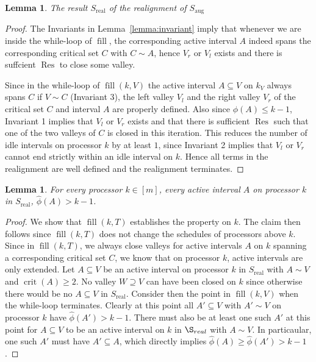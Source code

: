 \documentclass[a4paper]{article}
\DeclareMathOperator{\aug}{aug}
\DeclareMathOperator{\real}{real}
\DeclareMathOperator{\crit}{crit}
\DeclareMathOperator{\fillop}{fill}
\DeclareMathOperator{\res}{Res}
\newtheorem{lemma}[theorem]{Lemma}
\begin{document}
\begin{lemma}\label{lemma:s_real}
  The result $S_{\real}$ of the realignment of $S_{\aug}$ 
\end{lemma}
\begin{proof}
  The Invariants in Lemma~\ref{lemma:invariant} imply that whenever we are inside the while-loop of $\fillop$, the corresponding active interval $A$ indeed spans the corresponding critical set $C$ with $C \sim A$, hence $V_r$ or $V_l$ exists and there is suffcient $\res$ to close some valley.

  Since in the while-loop of $\fillop(k, V)$ the active interval $A \subseteq V$ on $k_V$ always spans $C$ if $V \sim C$ (Invariant 3), the left valley $V_l$ and the right valley $V_r$ of the critical set $C$ and interval $A$ are properly defined.
  Also since $\phi(A) \leq k - 1$, Invariant 1 implies that $V_l$ or $V_r$ exists and that there is sufficient $\res$ such that one of the two valleys of $C$ is closed in this iteration.
  This reduces the number of idle intervals on processor $k$ by at least $1$, since Invariant 2 implies that $V_l$ or $V_r$ cannot end strictly within an idle interval on $k$.
  Hence all terms in the realignment are well defined and the realignment terminates.
\end{proof}

\begin{lemma}\label{lemma:phi_prop}
  For every processor $k \in [m]$, every active interval $A$ on processor $k$ in $S_{\real}$, $\hat \phi(A) > k - 1$.
\end{lemma}
\begin{proof}
  We show that $\fillop(k, T)$ establishes the property on $k$.
  The claim then follows since $\fillop(k, T)$ does not change the schedules of processors above $k$.
  Since in $\fillop(k, T)$, we always close valleys for active intervals $A$ on $k$ spanning a corresponding critical set $C$, we know that on processor $k$, active intervals are only extended.
  Let $A \subseteq V$ be an active interval on processor $k$ in $S_{\real}$ with $A \sim V$ and $\crit(A) \geq 2$.
  No valley $W \supseteq V$ can have been closed on $k$ since otherwise there would be no $A \subseteq V$ in $S_{\real}$.
  Consider then the point in $\fillop(k, V)$ when the while-loop terminates.
  Clearly at this point all $A' \subseteq V$ with $A' \sim V$ on processor $k$ have $\hat \phi(A') > k - 1$.
  There must also be at least one such $A'$ at this point for $A \subseteq V$ to be an active interval on $k$ in $\S_{real}$ with $A \sim V$.
  In particaular, one such $A'$ must have $A' \subseteq A$, which directly implies $\hat \phi(A) \geq \hat \phi(A') > k - 1$.
\end{proof}
\end{document}
